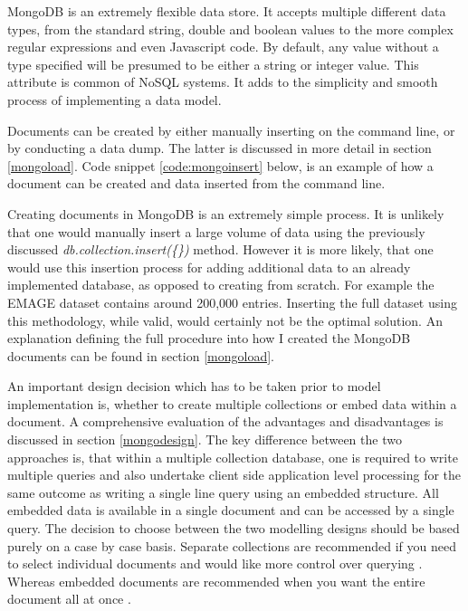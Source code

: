MongoDB is an extremely flexible data store. It accepts multiple different data types, from the standard string, double and boolean values to the more complex regular expressions and even Javascript code. By default, any value without a type specified will be presumed to be either a string or integer value. This attribute is common of NoSQL systems. It adds to the simplicity and smooth process of implementing a data model.

Documents can be created by either manually inserting on the command line, or by conducting a data dump. The latter is discussed in more detail in section \ref{mongoload}. Code snippet \ref{code:mongoinsert} below, is an example of how a document can be created and data inserted from the command line.

Creating documents in MongoDB is an extremely simple process. It is unlikely that one would manually insert a large volume of data using the previously discussed \textit{db.collection.insert(\{\})} method. However it is more likely, that one would use this insertion process for adding additional data to an already implemented database, as opposed to creating from scratch. For example the EMAGE dataset contains around 200,000 entries. Inserting the full dataset using this methodology, while valid, would certainly not be the optimal solution. An explanation defining the full procedure into how I created the MongoDB documents can be found in section \ref{mongoload}.

An important design decision which has to be taken prior to model implementation is, whether to create multiple collections or embed data within a document. A comprehensive evaluation of the advantages and disadvantages is discussed in section \ref{mongodesign}. The key difference between the two approaches is, that within a multiple collection database, one is required to write multiple queries and also undertake client side application level processing for the same outcome as writing a single line query using an embedded structure. All embedded data is available in a single document and can be accessed by a single query. The decision to choose between the two modelling designs should be based purely on a case by case basis. Separate collections are recommended if you need to select individual documents and would like more control over querying \cite{md}. Whereas embedded documents are recommended when you want the entire document all at once \cite{md}.

